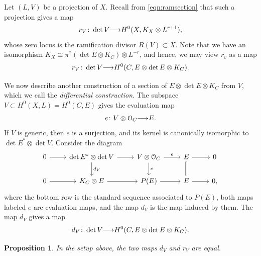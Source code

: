 \documentclass[11pt,reqno]{amsart}
\theoremstyle{plain}
\newtheorem{proposition}[theorem]{Proposition}
\theoremstyle{definition}
\theoremstyle{remark}
\numberwithin{equation}{section}
\renewcommand{\to}{{\longrightarrow}}
\numberwithin{equation}{section}
\renewcommand{\O}{\mathcal O}
\begin{document}
Let $(L, V)$ be a projection of $X$.
Recall from \eqref{eqn:ramsection} that such a projection gives a map
\[ r_V \from \det V \to H^0(X, K_X \otimes L^{r+1}),\]
whose zero locus is the ramification divisor $R(V) \subset X$.
Note that we have an isomorphism $K_X \cong \pi^* (\det E \otimes K_C) \otimes L^{-r}$, and hence, we may view $r_v$ as a map
\[ r_V \from \det V \to H^0(C, E \otimes \det E \otimes K_C).\]

We now describe another construction of a section of $E \otimes \det E \otimes K_C$ from $V$, which we call the \emph{differential construction}.
The subspace $V \subset H^0(X, L) = H^0(C, E)$ gives the evaluation map
\[ e \from V \otimes \O_C \to E.\]
If $V$ is generic, then $e$ is a surjection, and its kernel is canonically isomorphic to $\det E^* \otimes \det V$.
Consider the diagram
\begin{equation}\label{eqn:differential_construction}
\begin{tikzcd}
  0 \arrow{r}& \det E^* \otimes \det V \arrow{r}\arrow{d}{d_V}& V \otimes \O_C \arrow{r}{e}\arrow{d}{e}& E \arrow{r}\arrow[equal]{d}& 0 \\
  0 \arrow{r}& K_C \otimes E \arrow{r}& P(E) \arrow{r}& E \arrow{r}& 0,
\end{tikzcd}
\end{equation}
where the bottom row is the standard sequence associated to $P(E)$, both maps labeled $e$ are evaluation maps, and the map $d_V$ is the map induced by them.
The map $d_V$ gives a map
\[ d_V \from \det V \to H^0(C, E \otimes \det E \otimes K_C).\]
\begin{proposition}\label{prop:rdv}
  In the setup above, the two maps $d_V$ and $r_V$ are equal.
\end{proposition}
\end{document}
